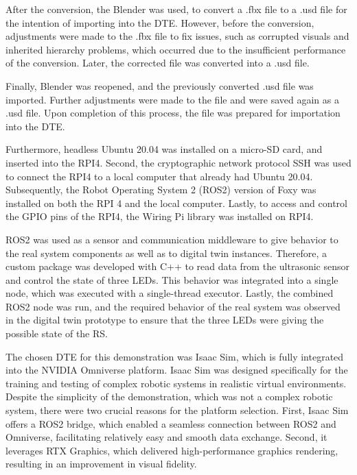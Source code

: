 \documentclass[conference]{IEEEtran}
\begin{document}
    After the conversion, the Blender was used, to convert a .fbx file to a .usd file for the intention of importing into the DTE. However, before the conversion, 
    adjustments were made to the .fbx file to fix issues, such as corrupted visuals and inherited hierarchy problems, which occurred due to the insufficient performance of the conversion. 
    Later, the corrected file was converted into a .usd file. 

    Finally, Blender was reopened, and the previously converted .usd file was imported. Further adjustments were made to the file and were saved again as a .usd file. Upon completion of this process, 
    the file was prepared for importation into the DTE.

    Furthermore, headless Ubuntu 20.04 was installed on a micro-SD card, and inserted into the RPI4. Second, the cryptographic network protocol SSH was used to connect the RPI4 to a local computer that already had Ubuntu 20.04.
     Subsequently, the Robot Operating System 2 (ROS2) version of Foxy was installed on both the RPI 4 and the local computer. 
     Lastly, to access and control the GPIO pins of the RPI4, the Wiring Pi library was installed on RPI4.

    ROS2 was used as a sensor and communication middleware to give behavior to the real system components as well as to digital twin instances. 
    Therefore, a custom package was developed with C++  to read data from the ultrasonic sensor and control the state of three LEDs. This behavior was integrated into a single node, which was executed with a single-thread executor. Lastly, the combined ROS2 node was run, and the required behavior of the real system was observed in the digital twin prototype to ensure that the three LEDs were giving the possible state of the RS.

    The chosen DTE for this demonstration was Isaac Sim, which is fully integrated into the NVIDIA Omniverse platform. Isaac Sim was designed specifically for the training and testing of complex robotic 
    systems in realistic virtual environments. Despite the simplicity of the demonstration, which was not a complex robotic system, there were two crucial reasons for the platform selection. 
    First, Isaac Sim offers a ROS2 bridge, which enabled a seamless connection between ROS2 and Omniverse, facilitating relatively easy and smooth data exchange. Second, it leverages RTX Graphics, 
    which delivered high-performance graphics rendering, resulting in an improvement in visual fidelity. 
\end{document}
